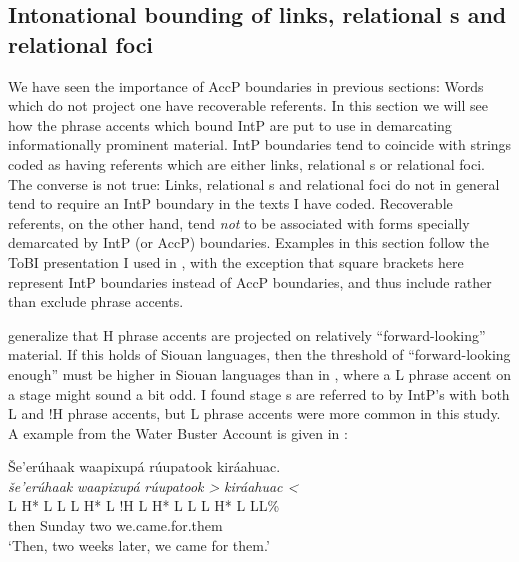 \documentclass[output=paper]{LSP/langsci}
\begin{document}
\subsection{Intonational bounding of links, relational s and relational foci}\label{intonationalbounding}
	
	We have seen the importance of AccP boundaries in previous sections: Words which do not project one have recoverable referents. In this section we will see how the phrase accents which bound IntP are put to use in demarcating informationally prominent material. IntP boundaries tend to coincide with strings coded as having referents which are either links, relational s or relational foci. The converse is not true: Links, relational s and relational foci do not in general tend to require an IntP boundary in the texts I have coded. Recoverable referents, on the other hand, tend \emph{not} to be associated with forms specially demarcated by IntP (or AccP) boundaries. Examples in this section follow the ToBI presentation I used in , with the exception that square brackets here represent IntP boundaries instead of AccP boundaries, and thus include rather than exclude phrase accents.
	
	\citet{PierrehumbertHirschberg1990} generalize that H phrase accents are projected on relatively “forward-looking” material. If this   
	holds of Siouan languages, then the threshold of “forward-looking enough” must be higher in Siouan languages than in , where a L phrase accent on a stage  might sound a bit odd. I found stage s are referred to by IntP’s with both L and !H phrase accents, but L phrase accents were more common in this study. A  example from the Water Buster Account is given in :

	\newpage 
\ea\label{waterbusterstagetopic}
Še’erúhaak waapixupá rúupatook kiráahuac.\footnotemark\\
\glll	\emph{še’erúhaak}		\emph{waapixupá}		\emph{rúupatook >	}	\emph{kiráahuac <}\\
	{\ob L H* L L\cb}		{\ob L H* L !H\cb}		{\ob L H* L L\cb}		{\ob L H* L L\cb{}L\%}\\
	then				Sunday			two				we.came.for.them\\
\glt	`Then, two weeks later, we came for them.'
\z
\end{document}
